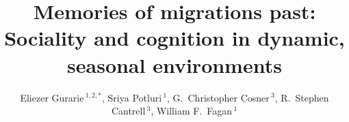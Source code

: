 \documentclass[utf8]{frontiersSCNS} %
\def\firstAuthorLast{Sample {et~al.}} %
\def\Authors{Eliezer Gurarie\,$^{1,2,*}$, 
	Sriya Potluri\,$^1$, 
	G.~Christopher Cosner\,$^3$,
	R.~Stephen Cantrell\,$^3$,
	William F.~Fagan\,$^1$
}
\begin{document}
	\onecolumn
	
	\title[Sociality, memory and migration]{Memories of migrations past: Sociality and cognition in dynamic, seasonal environments} 
	
	\author[\firstAuthorLast ]{\Authors} %
	\address{} %
	\correspondance{} %
	
	\extraAuth{}%
	
	
	\maketitle
	
\end{document}
